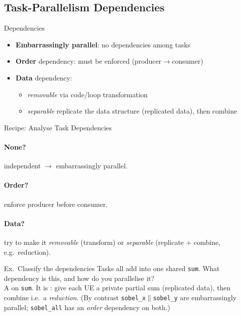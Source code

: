 \subsection{Task-Parallelism Dependencies}

\begin{definition}{Dependencies}
    \begin{itemize}
        \item \textbf{Embarrassingly parallel}: no dependencies among tasks
        \item \textbf{Order} dependency: must be enforced (producer$\to$consumer)
        \item \textbf{Data} dependency:
        \begin{itemize}
            \item \emph{removable} via code/loop transformation
            \item \emph{separable} replicate the data structure (replicated data), then combine
        \end{itemize}
    \end{itemize}
\end{definition}

\begin{KR}{Recipe: Analyse Task Dependencies}
    \paragraph{None?} independent $\to$ embarrassingly parallel.
    \paragraph{Order?} enforce producer before consumer.
    \paragraph{Data?} try to make it \emph{removable} (transform) or \emph{separable} (replicate + combine, e.g.\ reduction).
\end{KR}

\begin{example2}{Ex.\ Classify the dependencies}
    Tasks all add into one shared \texttt{sum}. What dependency is this, and how do you parallelise it?
     \\ 
    A  on \texttt{sum}. It is : give each UE a private partial sum (replicated data), then combine i.e.\ a \emph{reduction}. (By contrast \texttt{sobel\_x}$\parallel$\texttt{sobel\_y} are embarrassingly parallel; \texttt{sobel\_all} has an \emph{order} dependency on both.)
\end{example2}

